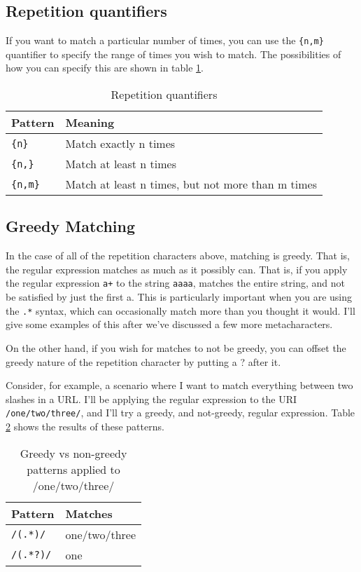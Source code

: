 \subsection{Repetition quantifiers}

If you want to match a particular number of times, you can use the
\verb={n,m}= quantifier to specify the range of times you wish to match.
The possibilities of how you can specify this are shown in table
\ref{repetition_quantifiers}.

\begin{table}[ht]
\caption{Repetition quantifiers}
\label{repetition_quantifiers}
\begin{tabular}{l | p{12cm}}
Pattern & Meaning\\ \hline \hline
\verb={n}= & Match exactly n times \\ \hline
\verb={n,}= & Match at least n times \\ \hline
\verb={n,m}= & Match at least n times, but not more than m times \\ \hline 
\end{tabular}
\end{table}

\subsection{Greedy Matching}
\label{greedy}

In the case of all of the repetition characters above, matching is greedy. That is, the regular 
expression matches as much as it possibly can. That is, if you apply the regular expression 
\verb=a+= to the string \verb~aaaa~, matches the entire string, and not be satisfied by just the first 
a. This is particularly important when you are using the \verb=.*= syntax, which can 
occasionally match more than you thought it would. I'll give some examples of this after 
we've discussed a few more metacharacters.

On the other hand, if you wish for matches to not be greedy, you can
offset the greedy nature of the repetition character by putting a ?
after it.

Consider, for example, a scenario where I want to match everything between two
slashes in a URL. I'll be applying the regular expression to the URI
\verb=/one/two/three/=, and I'll try a greedy, and not-greedy, regular
expression. Table \ref{table_greedy_example} shows the results of these
patterns.

\begin{table}[ht]
\caption{Greedy vs non-greedy patterns applied to /one/two/three/}
\label{table_greedy_example}
\begin{tabular}{l | p{12cm}}
Pattern & Matches \\ \hline \hline
\verb=/(.*)/= & one/two/three \\ \hline
\verb=/(.*?)/= & one \\ \hline
\end{tabular}
\end{table}

